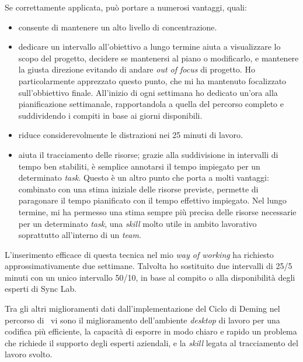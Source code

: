 Se correttamente applicata, può portare a numerosi vantaggi, quali:
\begin{itemize}
  \item consente di mantenere un alto livello di concentrazione.
  \item dedicare un intervallo all'obiettivo a lungo termine aiuta a visualizzare lo scopo del progetto, decidere se mantenersi al piano o modificarlo, e mantenere la giusta direzione evitando di andare \textit{out of focus} di progetto.
  Ho particolarmente apprezzato questo punto, che mi ha mantenuto focalizzato sull'obbiettivo finale. All'inizio di ogni settimana ho dedicato un'ora alla pianificazione settimanale, rapportandola a quella del percorso completo e suddividendo i compiti in base ai giorni disponibili.
  \item riduce considerevolmente le distrazioni nei 25 minuti di lavoro.
  \item aiuta il tracciamento delle risorse; grazie alla suddivisione in intervalli di tempo ben stabiliti, è semplice annotarsi il tempo impiegato per un determinato \textit{task}. Questo è un altro punto che porta a molti vantaggi: combinato con una stima iniziale delle risorse previste, permette di paragonare il tempo pianificato con il tempo effettivo impiegato. Nel lungo termine, mi ha permesso una stima sempre più precisa delle risorse necessarie per un determinato \textit{task}, una \textit{skill} molto utile in ambito lavorativo soprattutto all'interno di un \textit{team}.
\end{itemize}
L'inserimento efficace di questa tecnica nel mio \textit{way of working} ha richiesto approssimativamente due settimane.
Talvolta ho sostituito due intervalli di 25/5 minuti con un unico intervallo 50/10, in base al compito o alla disponibilità degli esperti di Sync Lab.

Tra gli altri miglioramenti dati dall'implementazione del Ciclo di Deming nel percorso di \stage\ vi sono il miglioramento dell'ambiente \textit{desktop} di lavoro per una codifica più efficiente, la capacità di esporre in modo chiaro e rapido un problema che richiede il supporto degli esperti aziendali, e la \textit{skill} legata al tracciamento del lavoro svolto.

